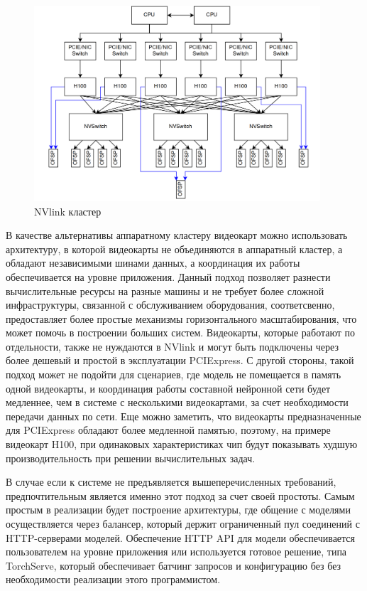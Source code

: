 \begin{figure}[H]
  \centering
  \includegraphics[width=0.95\textwidth]{img/nvlink.png}
  \caption{NVlink кластер}
    \label{fig:nvlink}
\end{figure}


В качестве альтернативы аппаратному кластеру видеокарт можно использовать архитектуру, в которой видеокарты не объединяются
в аппаратный кластер, а обладают независимыми шинами данных, а координация их работы обеспечивается на уровне приложения.
Данный подход позволяет разнести вычислительные ресурсы на разные машины и не требует более сложной инфраструктуры, связанной
с обслуживанием оборудования, соответсвенно, предоставляет более простые механизмы горизонтального масштабирования,
что может помочь в построении больших систем. Видеокарты, которые работают по отдельности, также не нуждаются в 
NVlink и могут быть подключены через более дешевый и простой в эксплуатации PCIExpress.
С другой стороны, такой подход может не подойти для сценариев, где модель не помещается в память одной видеокарты, и координация
работы составной нейронной сети будет медленнее, чем в системе с несколькими видеокартами, за счет необходимости
передачи данных по сети. Еще можно заметить, что видеокарты предназначенные для PCIExpress обладают более медленной
памятью, поэтому, на примере видеокарт H100, при одинаковых характеристиках чип будут показывать худшую производительность
при решении вычислительных задач.

В случае если к системе не предъявляется вышеперечисленных требований, предпочтительным является именно этот подход за счет своей простоты.
Самым простым в реализации будет построение архитектуры, где общение с моделями осуществляется через балансер, который
держит ограниченный пул соединений с HTTP-серверами моделей. Обеспечение HTTP API для модели обеспечивается пользователем
на уровне приложения или используется готовое решение, типа TorchServe, который обеспечивает батчинг запросов и конфигурацию без
без необходимости реализации этого программистом.

